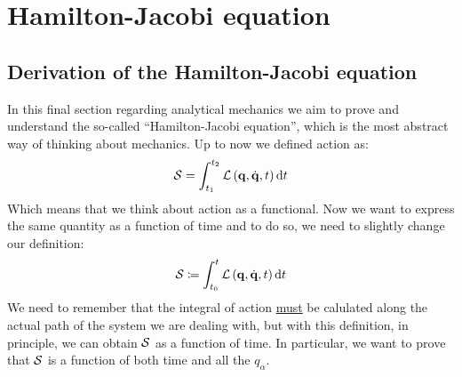 \chapter{Hamilton-Jacobi equation}
\section{Derivation of the Hamilton-Jacobi equation}
In this final section regarding analytical mechanics we aim to prove and understand the so-called ``Hamilton-Jacobi equation'', which is the most abstract way of thinking about mechanics. Up to now we defined action as:
\begin{equation}
  \mathcal{S} = \int_{t_1}^{t_2}\mathcal{L}\left(\vb{q},\dot{\vb{q}},t\right) \dd{t}
\end{equation}
Which means that we think about action as a functional. Now we want to express the same quantity as a function of time and to do so, we need to slightly change our definition:
\begin{equation}
  \mathcal{S} \coloneqq \int_{t_0}^{t}\mathcal{L}\left(\vb{q},\dot{\vb{q}},t\right) \dd{t}
\end{equation}
We need to remember that the integral of action \underline{must} be calulated along the actual path of the system we are dealing with, but with this definition, in principle, we can obtain $\mathcal{S}$ as a function of time. In particular, we want to prove that $\mathcal{S}$ is a function of both time and all the $q_{\alpha}$.

